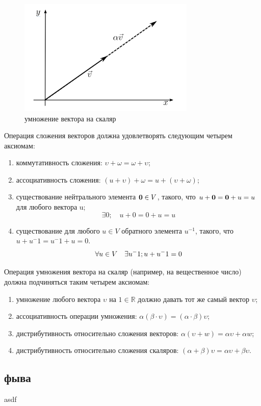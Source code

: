\documentclass{article}
\begin{document}
\begin{figure}[H]
	\centering
	\includegraphics[width=0.75\textwidth]{2vector_proiz}  
	\caption{умножение вектора на скаляр}
\end{figure}

Операция сложения векторов должна удовлетворять следующим четырем
аксиомам:
\begin{enumerate}
  \item коммутативность сложения: $\upsilon + \omega = \omega + \upsilon$;
  \item ассоциативность сложения: $(u + \upsilon) + \omega = u + (\upsilon + \omega)$;
	\item существование нейтрального элемента $\textbf0 \in V$, 
	такого, что $u + \textbf0 = \textbf0+u = u$ для любого вектора u;
	\[\exists0;\quad u+0=0+u=u\]
	\item существование для любого $u \in V$ обратного элемента $u^{-1}$, 
	такого, что $u+u^-1 = u^-1+u = 0$.
	\[\forall u \in \mathnormal{V} \quad \exists u^-1 ; u + u^-1 = 0  \]
\end{enumerate}

Операция умножения вектора на скаляр (например, на вещественное число) должна подчиняться таким четырем аксиомам:
\begin{enumerate}
  \item умножение любого вектора $\upsilon$ на $1 \in \mathbb{R}$ должно давать тот же самый вектор $\upsilon$;
  \item ассоциативность операции умножения: $\alpha(\beta \cdot \upsilon) = (\alpha \cdot \beta) \upsilon$;
	\item дистрибутивность относительно сложения векторов: $\alpha(\upsilon + w) = \alpha \upsilon + \alpha w$;
	\item дистрибутивность относительно сложения скаляров: $(\alpha + \beta)\upsilon = \alpha\upsilon + \beta\upsilon$.
\end{enumerate}

\subsection{фыва}
asdf
\end{document}
